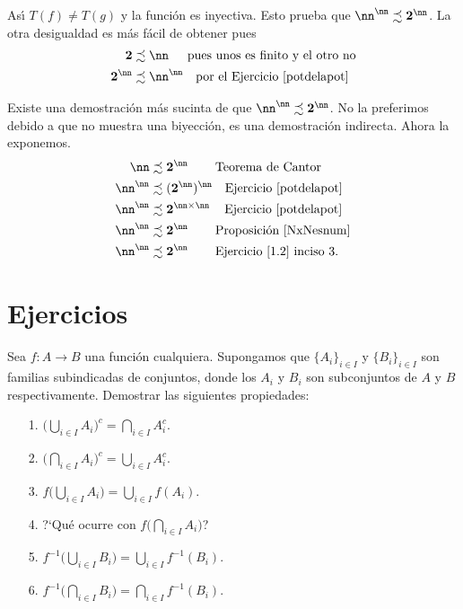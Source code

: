 \begin{demo}
As\'{\i} $T(f)\neq T(g)$ y la funci\'on es inyectiva. Esto prueba
que $\nn^{\nn}\precsim \mathbf{2}^{\nn}$. La otra desigualdad es
m\'as f\'acil de obtener pues
\[
  \begin{split}
      \mathbf{2}&\precsim \nn\quad\,\,\, \text{pues unos es finito y el
      otro no}\\
      \mathbf{2}^{\nn}&\precsim\nn^{\nn}\quad \text{por el
      Ejercicio \ref{potdelapot} }
  \end{split}
\]
\end{demo}

Existe una demostraci\'on m\'as sucinta de que
$\nn^{\nn}\precsim\mathbf{2}^{\nn}$. No la preferimos debido a que
no muestra una biyecci\'on, es una demostraci\'on indirecta. Ahora
la exponemos.
\[
  \begin{split}
       \nn &\precsim \mathbf{2}^{\nn}\quad\quad\,\text{Teorema de
       Cantor}\\
       \nn^{\nn} &\precsim (\mathbf{2}^{\nn})^{\nn}\quad\text{Ejercicio
       \ref{potdelapot}}\\
        \nn^{\nn} &\precsim \mathbf{2}^{\nn\times\nn}\quad\,\text{Ejercicio
       \ref{potdelapot}}\\
        \nn^{\nn} &\precsim \mathbf{2}^{\nn}\quad\quad\,\text{Proposici\'on  \ref{NxNesnum}}\\
        \nn^{\nn} &\precsim \mathbf{2}^{\nn}\quad\quad\,\text{Ejercicio
       \ref{1.2} inciso 3}.
  \end{split}
\]


\section{Ejercicios}


\begin{ejercicio}\label{propuniarb} Sea $f:A\longrightarrow B$ una funci\'on cualquiera.
Supongamos que $\{A_i\}_{i\in I}$ y $\{B_i\}_{i\in I}$ son
familias subindicadas de conjuntos, donde los $A_i$ y $B_i$ son
subconjuntos de $A$ y $B$ respectivamente. Demostrar las
siguientes propiedades:
\end{ejercicio}
\begin{itemize}
\item[1.] $\biggl(\bigcup_{i\in I}A_i\biggr)^c=\bigcap_{i\in
I}A_i^c$.
\item[2.]$\biggl(\bigcap_{i\in I}A_i\biggr)^c=\bigcup_{i\in
I}A_i^c$.
\item[3.] $f\biggl(\bigcup_{i\in I}A_i\biggr)=\bigcup_{i\in
I}f(A_i)$.
\item[4.]?`Qu\'e ocurre con $f\biggl(\bigcap_{i\in I}A_i\biggr)$?
\item[5.] $f^{-1}\biggl(\bigcup_{i\in I}B_i\biggr)=\bigcup_{i\in
I}f^{-1}(B_i)$.
\item[6.]$f^{-1}\biggl(\bigcap_{i\in I}B_i\biggr)=\bigcap_{i\in
I}f^{-1}(B_i)$.
\end{itemize}

